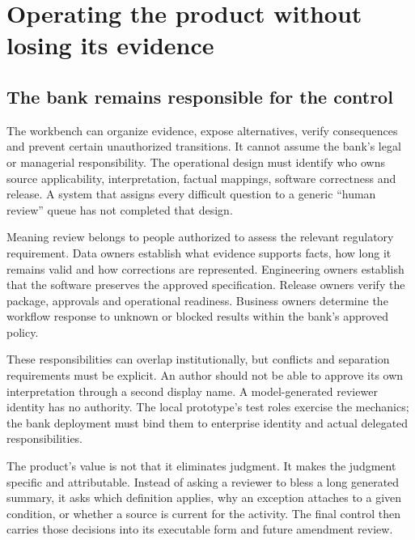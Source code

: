 \chapter{Operating the product without losing its evidence}
\label{ch:operation}

\section{The bank remains responsible for the control}
\label{merge:M10:00}


The workbench can organize evidence, expose alternatives, verify consequences and
prevent certain unauthorized transitions. It cannot assume the bank's legal or
managerial responsibility. The operational design must identify who owns source
applicability, interpretation, factual mappings, software correctness and release.
A system that assigns every difficult question to a generic ``human review'' queue
has not completed that design.

Meaning review belongs to people authorized to assess the relevant regulatory
requirement. Data owners establish what evidence supports facts, how long it
remains valid and how corrections are represented. Engineering owners establish
that the software preserves the approved specification. Release owners verify the
package, approvals and operational readiness. Business owners determine the
workflow response to unknown or blocked results within the bank's approved policy.


These responsibilities can overlap institutionally, but conflicts and separation
requirements must be explicit. An author should not be able to approve its own
interpretation through a second display name. A model-generated reviewer identity
has no authority. The local prototype's test roles exercise the mechanics; the
bank deployment must bind them to enterprise identity and actual delegated
responsibilities.

The product's value is not that it eliminates judgment. It makes the judgment
specific and attributable. Instead of asking a reviewer to bless a long generated
summary, it asks which definition applies, why an exception attaches to a given
condition, or whether a source is current for the activity. The final control
then carries those decisions into its executable form and future amendment review.

